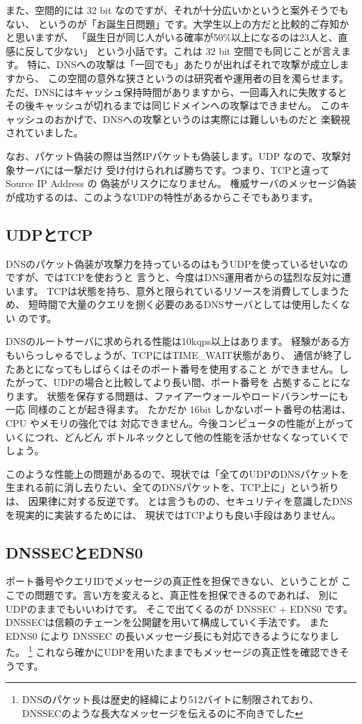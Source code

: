 また、空間的には 32 bit なのですが、それが十分広いかというと案外そうでもない、
というのが「お誕生日問題」です。大学生以上の方だと比較的ご存知かと思いますが、
「誕生日が同じ人がいる確率が50\%以上になるのは23人と、直感に反して少ない」
という小話です。これは 32 bit 空間でも同じことが言えます。
特に、DNSへの攻撃は「一回でも」あたりが出ればそれで攻撃が成立しますから、
この空間の意外な狭さというのは研究者や運用者の目を濁らせます。
ただ、DNSにはキャッシュ保持時間がありますから、一回毒入れに失敗すると
その後キャッシュが切れるまでは同じドメインへの攻撃はできません。
このキャッシュのおかげで、DNSへの攻撃というのは実際には難しいものだと
楽観視されていました。

なお、パケット偽装の際は当然IPパケットも偽装します。UDP なので、攻撃対象サーバには一撃だけ
受け付けられれば勝ちです。つまり、TCPと違って Source IP Address の
偽装がリスクになりません。
権威サーバのメッセージ偽装が成功するのは、このようなUDPの特性があるからこそでもあります。

\subsection{UDPとTCP}
DNSのパケット偽装が攻撃力を持っているのはもうUDPを使っているせいなのですが、ではTCPを使おうと
言うと、今度はDNS運用者からの猛烈な反対に遭います。
TCPは状態を持ち、意外と限られているリソースを消費してしまうため、
短時間で大量のクエリを捌く必要のあるDNSサーバとしては使用したくない
のです。

DNSのルートサーバに求められる性能は10kqps以上はあります。
経験がある方もいらっしゃるでしょうが、TCPにはTIME\_WAIT状態があり、
通信が終了したあとになってもしばらくはそのポート番号を使用すること
ができません。したがって、UDPの場合と比較してより長い間、ポート番号を
占拠することになります。
状態を保存する問題は、ファイアーウォールやロードバランサーにも一応
同様のことが起き得ます。
たかだか 16bit しかないポート番号の枯渇は、CPU やメモリの強化では
対応できません。今後コンピュータの性能が上がっていくにつれ、どんどん
ボトルネックとして他の性能を活かせなくなっていくでしょう。

このような性能上の問題があるので、現状では「全てのUDPのDNSパケットを
生まれる前に消し去りたい、全てのDNSパケットを、TCP上に」という祈りは、
因果律に対する反逆です。
とは言うものの、セキュリティを意識したDNSを現実的に実装するためには、
現状ではTCPよりも良い手段はありません。

\subsection{DNSSECとEDNS0}
ポート番号やクエリIDでメッセージの真正性を担保できない、ということが
ここでの問題です。言い方を変えると、真正性を担保できるのであれば、
別にUDPのままでもいいわけです。
そこで出てくるのが DNSSEC + EDNS0 です。
DNSSECは信頼のチェーンを公開鍵を用いて構成していく手法です。
また EDNS0 により DNSSEC の長いメッセージ長にも対応できるようになりました。
\footnote{DNSのパケット長は歴史的経緯により512バイトに制限されており、
DNSSECのような長大なメッセージを伝えるのに不向きでした}
これなら確かにUDPを用いたままでもメッセージの真正性を確認できそうです。

